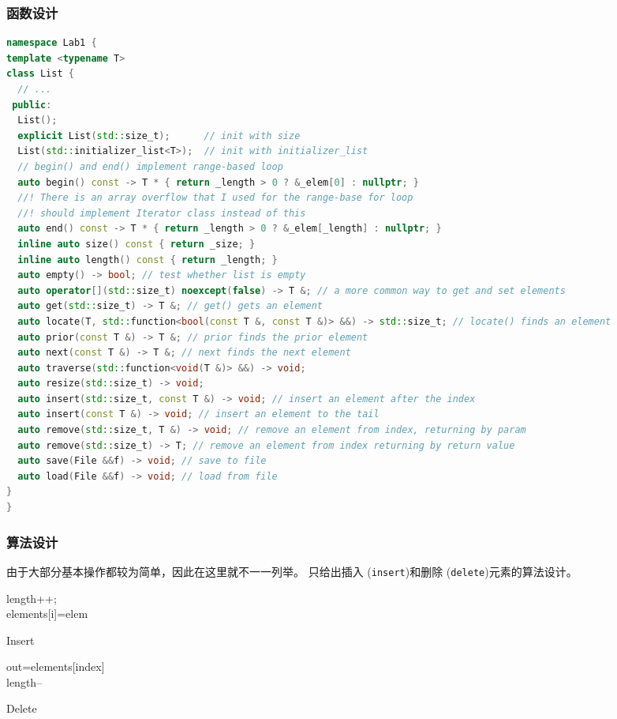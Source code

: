 \documentclass[format=draft,language=chinese,category=academic-report]{hustreport}
\begin{document}
\subsubsection{函数设计}
\begin{lstlisting}[language=c++]
namespace Lab1 {
template <typename T>
class List {
  // ...
 public:
  List();
  explicit List(std::size_t);      // init with size
  List(std::initializer_list<T>);  // init with initializer_list
  // begin() and end() implement range-based loop
  auto begin() const -> T * { return _length > 0 ? &_elem[0] : nullptr; }
  //! There is an array overflow that I used for the range-base for loop
  //! should implement Iterator class instead of this
  auto end() const -> T * { return _length > 0 ? &_elem[_length] : nullptr; }
  inline auto size() const { return _size; }
  inline auto length() const { return _length; }
  auto empty() -> bool; // test whether list is empty
  auto operator[](std::size_t) noexcept(false) -> T &; // a more common way to get and set elements
  auto get(std::size_t) -> T &; // get() gets an element
  auto locate(T, std::function<bool(const T &, const T &)> &&) -> std::size_t; // locate() finds an element
  auto prior(const T &) -> T &; // prior finds the prior element
  auto next(const T &) -> T &; // next finds the next element
  auto traverse(std::function<void(T &)> &&) -> void;
  auto resize(std::size_t) -> void;
  auto insert(std::size_t, const T &) -> void; // insert an element after the index
  auto insert(const T &) -> void; // insert an element to the tail
  auto remove(std::size_t, T &) -> void; // remove an element from index, returning by param
  auto remove(std::size_t) -> T; // remove an element from index returning by return value
  auto save(File &&f) -> void; // save to file
  auto load(File &&f) -> void; // load from file
}
}
\end{lstlisting}
\subsubsection{算法设计}
由于大部分基本操作都较为简单，因此在这里就不一一列举。
只给出插入 (\texttt{insert})和删除 (\texttt{delete})元素的算法设计。
\newline
\begin{algorithm}[H]
    \SetAlgoLined
    length++;
    \\
    elements[i]=elem
\caption{Insert}\label{alg:insert}
\end{algorithm}
\begin{algorithm}
    \SetAlgoLined
    out=elements[index]
    \\
    length--
\caption{Delete}\label{alg:delete}
\end{algorithm}
\end{document}
